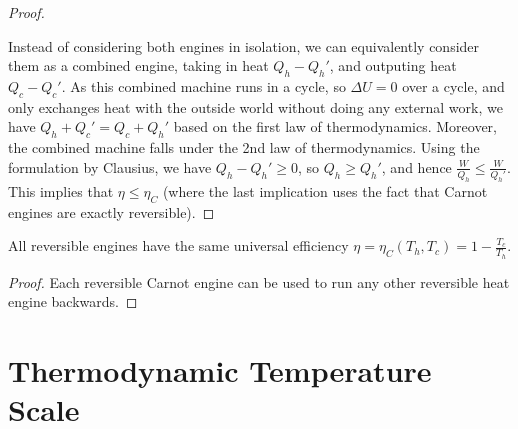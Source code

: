 \documentclass[12pt, a4paper, oneside, openright, titlepage]{book}
\begin{document}
\begin{proof}
\begin{center}
\begin{tikzpicture}[x=0.75pt,y=0.75pt,yscale=-1,xscale=1]
\end{tikzpicture}
    \end{center}
    Instead of considering both engines in isolation, we can equivalently consider them as a combined engine, taking in heat $Q_h - Q_h'$, and outputing heat $Q_c - Q_c'$. As this combined machine runs in a cycle, so $\Delta U = 0$ over a cycle, and only exchanges heat with the outside world without doing any external work, we have $Q_h + Q_c' = Q_c + Q_h'$ based on the first law of thermodynamics. Moreover, the combined machine falls under the 2nd law of thermodynamics. Using the formulation by Clausius, we have $Q_h - Q_h' \geq 0$, so $Q_h \geq Q_h'$, and hence $\frac{W}{Q_h} \leq \frac{W}{Q_h'}$. This implies that $\eta \leq \eta_C$ (where the last implication uses the fact that Carnot engines are exactly reversible).
\end{proof}

\begin{cor}
    All reversible engines have the same universal efficiency $\eta = \eta_C(T_h,T_c) = 1-\frac{T_c}{T_h}$.
\end{cor}
\begin{proof}
    Each reversible Carnot engine can be used to run any other reversible heat engine backwards.
\end{proof}



\section{Thermodynamic Temperature Scale}
\end{document}
